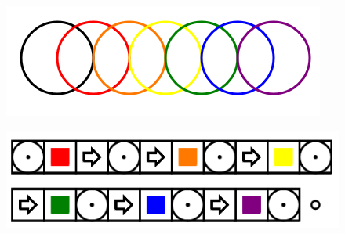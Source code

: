 \documentclass[11pt]{article}
\begin{document}
\begin{figure}
\includegraphics[scale=0.3]{image21.png}
\end{figure}
\begin{figure}
\includegraphics[scale=0.3]{image22.png}
\end{figure}
\end{document}
